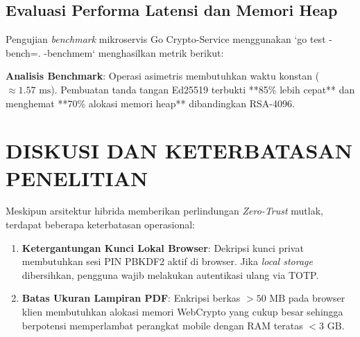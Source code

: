 \documentclass[conference]{IEEEtran}
\begin{document}
\subsection{Evaluasi Performa Latensi dan Memori Heap}
Pengujian \textit{benchmark} mikroservis Go Crypto-Service menggunakan `go test -bench=. -benchmem` menghasilkan metrik berikut:

\begin{table}[htbp]
\caption{Hasil Benchmark Latensi, Throughput, dan Memori Heap}
\label{tab:benchmark_results}
\centering
{}
\end{table}

\textbf{Analisis Benchmark}: Operasi asimetris membutuhkan waktu konstan ($\approx 1.57\text{ ms}$). Pembuatan tanda tangan Ed25519 terbukti **85\% lebih cepat** dan menghemat **70\% alokasi memori heap** dibandingkan RSA-4096.

\section{DISKUSI DAN KETERBATASAN PENELITIAN}
Meskipun arsitektur hibrida memberikan perlindungan \textit{Zero-Trust} mutlak, terdapat beberapa keterbatasan operasional:
\begin{enumerate}
    \item \textbf{Ketergantungan Kunci Lokal Browser}: Dekripsi kunci privat membutuhkan sesi PIN PBKDF2 aktif di browser. Jika \textit{local storage} dibersihkan, pengguna wajib melakukan autentikasi ulang via TOTP.
    \item \textbf{Batas Ukuran Lampiran PDF}: Enkripsi berkas $>50\text{ MB}$ pada browser klien membutuhkan alokasi memori WebCrypto yang cukup besar sehingga berpotensi memperlambat perangkat mobile dengan RAM teratas $<3\text{ GB}$.
\end{enumerate}
\end{document}

